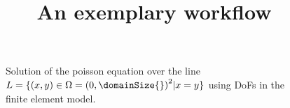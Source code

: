 \documentclass[12pt]{article}
\title{An exemplary workflow}
\begin{document}
\maketitle

\begin{figure}[h]
    \centering%
    \caption{Solution of the poisson equation over the line $L = \{(x, y)\in\Omega = {(0, \domainSize{})}^2 | x = y\}$ using \numDofs{} DoFs in the finite element model.}%
\end{figure}
\end{document}
